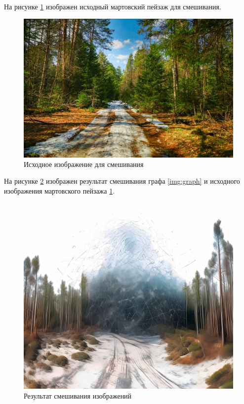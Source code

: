 На рисунке \ref{img:march} изображен исходный мартовский пейзаж для смешивания.
\begin{figure}[ht!]
	\centering
	\includegraphics[width=170mm]{./img/march1.png}
	\caption{Исходное изображение для смешивания}
	\label{img:march}
\end{figure}

На рисунке \ref{img:result} изображен результат смешивания графа \ref{img:graph} и исходного изображения мартовского пейзажа \ref{img:march}.
\begin{figure}[ht!]
	\centering
	\includegraphics[width=170mm]{./img/result1.png}
	\caption{Результат смешивания изображений}
	\label{img:result}
\end{figure}